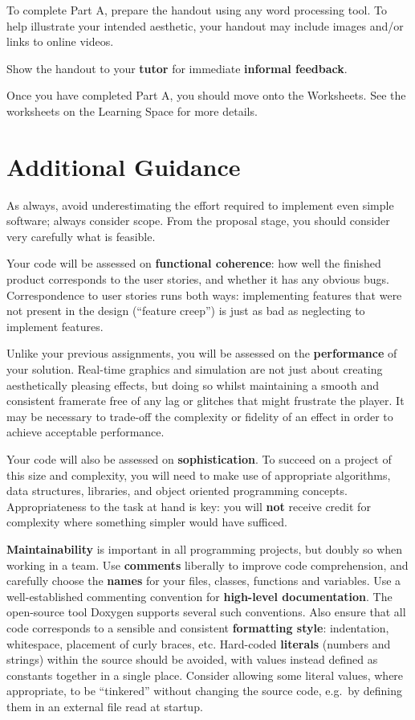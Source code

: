 \documentclass{../fal_assignment}
\begin{document}
To complete Part A, prepare the handout using any word processing tool.
To help illustrate your intended aesthetic, your handout may include images and/or links to online videos.

Show the handout to your \textbf{tutor} for immediate \textbf{informal feedback}.

Once you have completed Part A, you should move onto the Worksheets. See the worksheets on the Learning Space for more details.  

\section*{Additional Guidance}

As always, avoid underestimating the effort required to implement even simple software; always consider scope.
From the proposal stage, you should consider very carefully what is feasible.

Your code will be assessed on \textbf{functional coherence}:
how well the finished product corresponds to the user stories,
and whether it has any obvious bugs.
Correspondence to user stories runs both ways:
implementing features that were not present in the design (``feature creep'')
is just as bad as neglecting to implement features.

Unlike your previous assignments,
you will be assessed on the \textbf{performance} of your solution.
Real-time graphics and simulation are not just about creating aesthetically pleasing effects,
but doing so whilst maintaining a smooth and consistent framerate free of any lag or glitches that might frustrate the player.
It may be necessary to trade-off the complexity or fidelity of an effect
in order to achieve acceptable performance.

Your code will also be assessed on \textbf{sophistication}.
To succeed on a project of this size and complexity,
you will need to make use of appropriate algorithms, data structures, libraries, and object oriented programming concepts.
Appropriateness to the task at hand is key:
you will \textbf{not} receive credit for complexity  
where something simpler would have sufficed.

\textbf{Maintainability} is important in all programming projects,
but doubly so when working in a team.
Use \textbf{comments} liberally to improve code comprehension,
and carefully choose the \textbf{names} for your files, classes, functions and variables.
Use a well-established commenting convention
for \textbf{high-level documentation}.
The open-source tool Doxygen supports several such conventions.
Also ensure that all code corresponds to a sensible and consistent \textbf{formatting style}:
indentation, whitespace, placement of curly braces, etc.
Hard-coded \textbf{literals} (numbers and strings) within the source should be avoided,
with values instead defined as constants together in a single place.
Consider allowing some literal values, where appropriate, to be ``tinkered'' without changing the source code,
e.g.\ by defining them in an external file read at startup.
\end{document}
